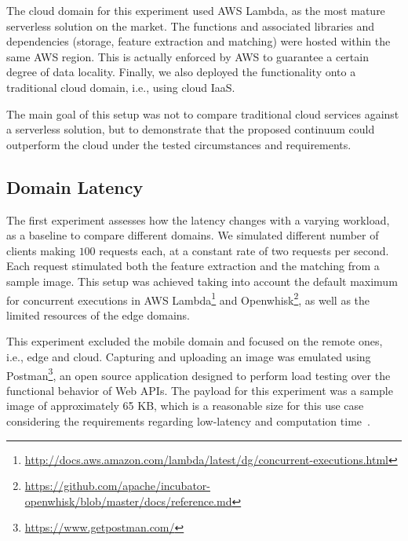The cloud domain for this experiment used AWS Lambda, as the most mature serverless solution on the market. The functions and associated libraries and dependencies (storage, feature extraction and matching) were hosted within the same AWS region. This is actually enforced by AWS to guarantee a certain degree of data locality. Finally, we also deployed the functionality onto a traditional cloud domain, i.e., using cloud IaaS. 

The main goal of this setup was not to compare traditional cloud services against a serverless solution, but to demonstrate that the proposed continuum could outperform the cloud under the tested circumstances and requirements.



\subsection{Domain Latency} 



The first experiment assesses how the latency changes with a varying workload, as a baseline to compare different domains. We simulated different number of clients making $100$ requests each, at a constant rate of two requests per second. Each request stimulated both the feature extraction and the matching from a sample image. This setup was achieved taking into account the default maximum for concurrent executions in AWS Lambda\footnote{\url{http://docs.aws.amazon.com/lambda/latest/dg/concurrent-executions.html}} and Openwhisk\footnote{\url{https://github.com/apache/incubator-openwhisk/blob/master/docs/reference.md}}, as well as the limited resources of the edge domains. 

This experiment excluded the mobile domain and focused on the remote ones, i.e., edge and cloud. Capturing and uploading an image was emulated using Postman\footnote{\url{https://www.getpostman.com/}}, an open source application designed to perform load testing over the functional behavior of Web APIs. The payload for this experiment was a sample image of approximately 65 KB, which is a reasonable size for this use case considering the requirements regarding low-latency and computation time~\cite{rodriguez16mobile}. 


